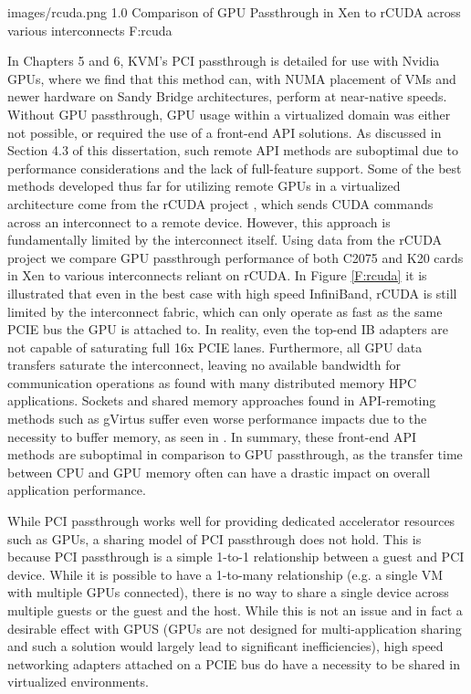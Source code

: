   {images/rcuda.png}
  {1.0}
  {Comparison of GPU Passthrough in Xen to rCUDA across various interconnects}
  {F:rcuda}

In Chapters 5 and 6, KVM's PCI passthrough is detailed for use with Nvidia GPUs, where we find that this method can, with NUMA placement of VMs and newer hardware on Sandy Bridge architectures, perform at near-native speeds. Without GPU passthrough, GPU usage within a virtualized domain was either not possible, or required the use of a front-end API solutions. As discussed in Section 4.3 of this dissertation, such remote API methods are suboptimal due to performance considerations and the lack of full-feature support. Some of the best methods developed thus far for utilizing remote GPUs in a virtualized architecture come from the rCUDA project \cite{duato2011enabling}, which sends CUDA commands across an interconnect to a remote device. However, this approach is fundamentally limited by the interconnect itself.  Using data from the rCUDA \cite{silla2013rcuda} project we compare GPU passthrough performance of both C2075 and K20 cards in Xen to various interconnects reliant on rCUDA.  In Figure \ref{F:rcuda} it is illustrated that even in the best case with high speed InfiniBand, rCUDA is still limited by the interconnect fabric, which can only operate as fast as the same PCIE bus the GPU is attached to.  In reality, even the top-end IB adapters are not capable of saturating full 16x PCIE lanes.  Furthermore,  all GPU data transfers saturate the interconnect, leaving no available bandwidth for communication operations as found with many distributed memory HPC applications.  Sockets and shared memory approaches found in API-remoting methods such as gVirtus \cite{gvirtus} suffer even worse performance impacts due to the necessity to buffer memory, as seen in \cite{walters2015gpu}.   In summary, these front-end API methods are suboptimal in comparison to GPU passthrough, as the transfer time between CPU and GPU memory often can have a drastic impact on overall application performance.

While PCI passthrough works well for providing dedicated accelerator resources such as GPUs, a sharing model of PCI passthrough does not hold. This is because PCI passthrough is a simple 1-to-1 relationship between a guest and PCI device. While it is possible to have a 1-to-many relationship (e.g. a single VM with multiple GPUs connected), there is no way to share a single device across multiple guests or the guest and the host. While this is not an issue and in fact a desirable effect with GPUS (GPUs are not designed for multi-application sharing and such a solution would largely lead to significant inefficiencies), high speed networking adapters attached on a PCIE bus do have a necessity to be shared in virtualized environments.

